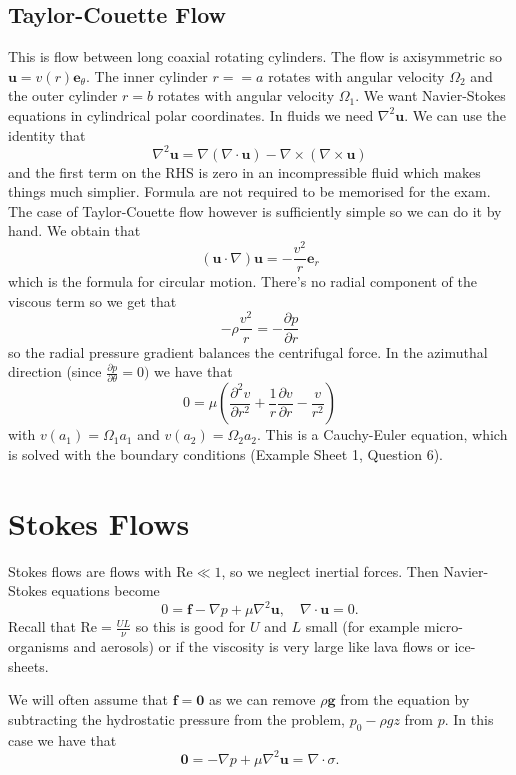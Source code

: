 \documentclass{article}
\begin{document}
\subsection{Taylor-Couette Flow}
This is flow between long coaxial rotating cylinders. The flow is axisymmetric so $ \mathbf u = v(r) \mathbf e_\theta $. The inner cylinder $ r==a $ rotates with angular velocity $ \Omega_2 $ and the outer cylinder $ r=b $ rotates with angular velocity $ \Omega_1 $. We want Navier-Stokes equations in cylindrical polar coordinates. In fluids we need $ \nabla^2 \mathbf u $. We can use the identity that
\[
  \nabla^2 \mathbf u = \nabla(\nabla \cdot\mathbf u) - \nabla\times(\nabla\times \mathbf u)
\]
and the first term on the RHS is zero in an incompressible fluid which makes things much simplier. Formula are not required to be memorised for the exam. The case of Taylor-Couette flow however is sufficiently simple so we can do it by hand. We obtain that 
\[
	(\mathbf u \cdot\nabla)\mathbf u = -\frac{v^2}r \mathbf e_r
\]
which is the formula for circular motion. There's no radial component of the viscous term so we get that
\[
	-\rho \frac{v^2} r= - \frac{\partial p}{\partial r}
\]
so the radial pressure gradient balances the centrifugal force. In the azimuthal direction (since $ \frac{\partial p}{\partial \theta} =0) $ we have that
\[
   0 = \mu\left(\frac{\partial^2 v}{\partial r^2} + \frac 1r\frac{\partial v}{\partial r} - \frac{v}{r^2}\right)
\]
with $ v(a_1) = \Omega_1a_1 $ and $ v(a_2) = \Omega_2 a_2 $. This is a Cauchy-Euler equation, which is solved with the boundary conditions (Example Sheet 1, Question 6).
\section{Stokes Flows}
Stokes flows are flows with $ \mathrm{Re}\ll 1 $, so we neglect inertial forces. Then Navier-Stokes equations become
\[
   0 =\mathbf f - \nabla p + \mu \nabla^2 \mathbf u,\quad \nabla\cdot\mathbf u = 0.
\]
Recall that $ \mathrm{Re} = \frac{UL}{\nu} $ so this is good for $ U $ and $ L $ small (for example micro-organisms and aerosols) or if the viscosity is very large like lava flows or ice-sheets.\par
We will often assume that $ \mathbf f = \mathbf 0 $ as we can remove $ \rho\mathbf g $ from the equation by subtracting the hydrostatic pressure from the problem, $ p_0-\rho gz $ from $ p $. In this case we have that
\[
  \mathbf 0 = -\nabla p + \mu\nabla^2 \mathbf u = \nabla \cdot \sigma.
\]
\end{document}
